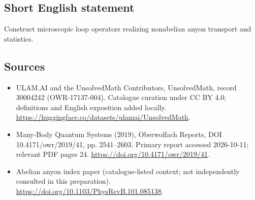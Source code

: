 \documentclass[11pt]{article}
\begin{document}
\subsection{Short English statement}
Construct microscopic loop operators realizing nonabelian anyon transport and statistics.
\subsection{Sources}
\begin{itemize}
\item[\hypertarget{source:30004242:1}{S1}] ULAM.AI and the UnsolvedMath Contributors, UnsolvedMath, record 30004242 (OWR-17137-004). Catalogue curation under CC BY 4.0; definitions and English exposition added locally.
\url{https://huggingface.co/datasets/ulamai/UnsolvedMath}.
\item[\hypertarget{source:30004242:2}{S2}] Many-Body Quantum Systems (2019), Oberwolfach Reports, DOI 10.4171/owr/2019/41, pp. 2541--2603. Primary report accessed 2026-10-11; relevant PDF pages 24.
\url{https://doi.org/10.4171/owr/2019/41}.
\item[\hypertarget{source:30004242:3}{S3}] Abelian anyon index paper (catalogue-listed context; not independently consulted in this preparation).
\url{https://doi.org/10.1103/PhysRevB.101.085138}.
\end{itemize}
\label{end:30004242}
\end{document}
